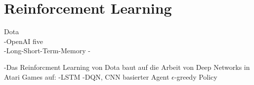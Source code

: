 \section{Reinforcement Learning}

Dota\\
-OpenAI five\\
-Long-Short-Term-Memory
-

-Das Reinforcment Learning von Dota baut auf die Arbeit von Deep Networks in Atari Games auf:
-LSTM
-DQN, CNN basierter Agent  $\epsilon$-greedy Policy








